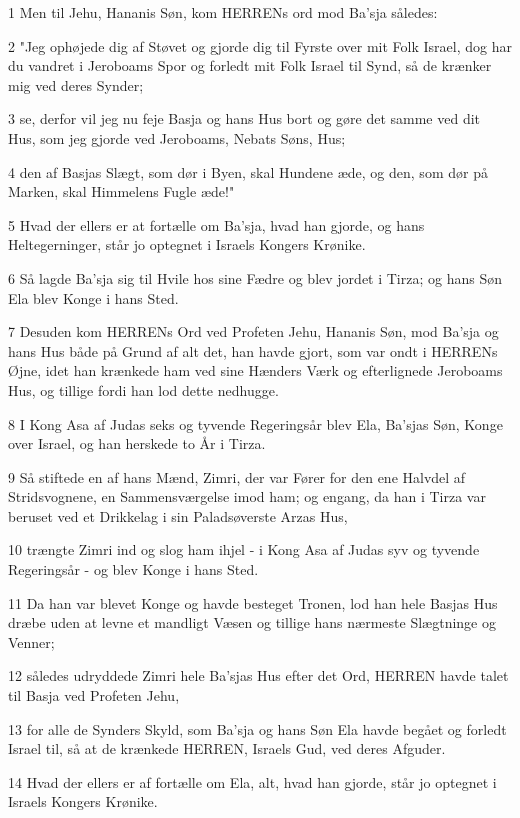 \par 1 Men til Jehu, Hananis Søn, kom HERRENs ord mod Ba'sja således:
\par 2 "Jeg ophøjede dig af Støvet og gjorde dig til Fyrste over mit Folk Israel, dog har du vandret i Jeroboams Spor og forledt mit Folk Israel til Synd, så de krænker mig ved deres Synder;
\par 3 se, derfor vil jeg nu feje Basja og hans Hus bort og gøre det samme ved dit Hus, som jeg gjorde ved Jeroboams, Nebats Søns, Hus;
\par 4 den af Basjas Slægt, som dør i Byen, skal Hundene æde, og den, som dør på Marken, skal Himmelens Fugle æde!"
\par 5 Hvad der ellers er at fortælle om Ba'sja, hvad han gjorde, og hans Heltegerninger, står jo optegnet i Israels Kongers Krønike.
\par 6 Så lagde Ba'sja sig til Hvile hos sine Fædre og blev jordet i Tirza; og hans Søn Ela blev Konge i hans Sted.
\par 7 Desuden kom HERRENs Ord ved Profeten Jehu, Hananis Søn, mod Ba'sja og hans Hus både på Grund af alt det, han havde gjort, som var ondt i HERRENs Øjne, idet han krænkede ham ved sine Hænders Værk og efterlignede Jeroboams Hus, og tillige fordi han lod dette nedhugge.
\par 8 I Kong Asa af Judas seks og tyvende Regeringsår blev Ela, Ba'sjas Søn, Konge over Israel, og han herskede to År i Tirza.
\par 9 Så stiftede en af hans Mænd, Zimri, der var Fører for den ene Halvdel af Stridsvognene, en Sammensværgelse imod ham; og engang, da han i Tirza var beruset ved et Drikkelag i sin Paladsøverste Arzas Hus,
\par 10 trængte Zimri ind og slog ham ihjel - i Kong Asa af Judas syv og tyvende Regeringsår - og blev Konge i hans Sted.
\par 11 Da han var blevet Konge og havde besteget Tronen, lod han hele Basjas Hus dræbe uden at levne et mandligt Væsen og tillige hans nærmeste Slægtninge og Venner;
\par 12 således udryddede Zimri hele Ba'sjas Hus efter det Ord, HERREN havde talet til Basja ved Profeten Jehu,
\par 13 for alle de Synders Skyld, som Ba'sja og hans Søn Ela havde begået og forledt Israel til, så at de krænkede HERREN, Israels Gud, ved deres Afguder.
\par 14 Hvad der ellers er af fortælle om Ela, alt, hvad han gjorde, står jo optegnet i Israels Kongers Krønike.
